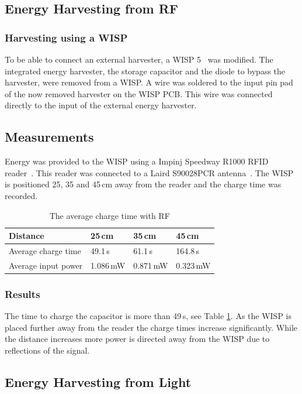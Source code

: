 \subsection{Energy Harvesting from RF}

\subsubsection{Harvesting using a WISP}
To be able to connect an external harvester, a WISP 5~\cite{sample_transim_2008} was modified.
The integrated energy harvester, the storage capacitor and the diode to bypass the harvester, were removed from a WISP.
A wire was soldered to the input pin pad of the now removed harvester on the WISP PCB.
This wire was connected directly to the input of the external energy harvester.

\subsection{Measurements}
Energy was provided to the WISP using a Impinj Speedway R1000 RFID reader~\cite{impinj_eol_2017, indy_r1000_2017}.
This reader was connected to a Laird S90028PCR antenna~\cite{laird_s9028pcr_2017}.
The WISP is positioned 25, 35 and 45\,cm away from the reader and the charge time was recorded.

\begin{table}[t]
	\centering
	\caption{The average charge time with RF}
	\label{tab:res_rf_harvest}
	\begin{tabular}{|l||l|l|l|}
		\hline
		Distance & 25\,cm & 35\,cm & 45\,cm \\
		\hline \hline
		Average charge time & 49.1\,s & 61.1\,s & 164.8\,s \\
		Average input power & 1.086\,mW & 0.871\,mW & 0.323\,mW \\
		\hline
	\end{tabular}
\end{table}

\subsubsection{Results}
The time to charge the capacitor is more than 49\,s, see Table \ref{tab:res_rf_harvest}.
As the WISP is placed further away from the reader the charge times increase significantly.
While the distance increases more power is directed away from the WISP due to reflections of the signal.

\subsection{Energy Harvesting from Light}

